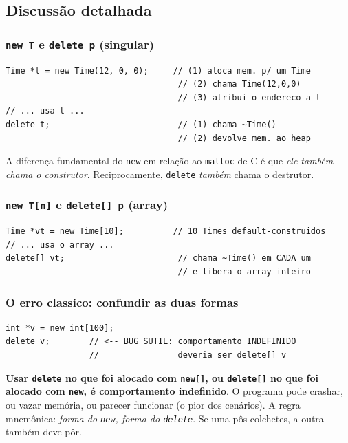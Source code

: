 \documentclass[11pt,a4paper]{article}
\begin{document}
\subsection*{Discuss\~ao detalhada}

\subsubsection*{\texttt{new T} e \texttt{delete p} (singular)}

\begin{lstlisting}[style=cppcode,numbers=none]
Time *t = new Time(12, 0, 0);     // (1) aloca mem. p/ um Time
                                   // (2) chama Time(12,0,0)
                                   // (3) atribui o endereco a t
// ... usa t ...
delete t;                          // (1) chama ~Time()
                                   // (2) devolve mem. ao heap
\end{lstlisting}

A diferen\c{c}a fundamental do \texttt{new} em rela\c{c}\~ao ao \texttt{malloc} de C \'e que \emph{ele tamb\'em chama o construtor}. Reciprocamente, \texttt{delete} \emph{tamb\'em} chama o destrutor.

\subsubsection*{\texttt{new T[n]} e \texttt{delete[] p} (array)}

\begin{lstlisting}[style=cppcode,numbers=none]
Time *vt = new Time[10];          // 10 Times default-construidos
// ... usa o array ...
delete[] vt;                       // chama ~Time() em CADA um
                                   // e libera o array inteiro
\end{lstlisting}

\subsubsection*{O erro classico: confundir as duas formas}

\begin{lstlisting}[style=cppcode,numbers=none]
int *v = new int[100];
delete v;        // <-- BUG SUTIL: comportamento INDEFINIDO
                 //                deveria ser delete[] v
\end{lstlisting}

\begin{errocomum}
\textbf{Usar \texttt{delete} no que foi alocado com \texttt{new[]}, ou \texttt{delete[]} no que foi alocado com \texttt{new}, \'e comportamento indefinido}. O programa pode crashar, ou vazar mem\'oria, ou parecer funcionar (o pior dos cen\'arios). A regra mnem\^onica: \emph{forma do \texttt{new}, forma do \texttt{delete}}. Se uma p\^os colchetes, a outra tamb\'em deve p\^or.
\end{errocomum}
\end{document}
